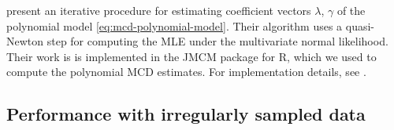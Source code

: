 \bigskip

\cite{pan2003modelling} present an iterative procedure for estimating coefficient vectors $\lambda$, $\gamma$ of the polynomial model \ref{eq:mcd-polynomial-model}. Their algorithm uses a quasi-Newton step for computing the MLE under the multivariate normal likelihood. Their work is  is implemented in the JMCM package for \textsf{R}, which we used to compute the polynomial MCD estimates.  For implementation details, see \cite{pan2017jmcm}. 	 


\subsection{Performance with irregularly sampled data}

%


